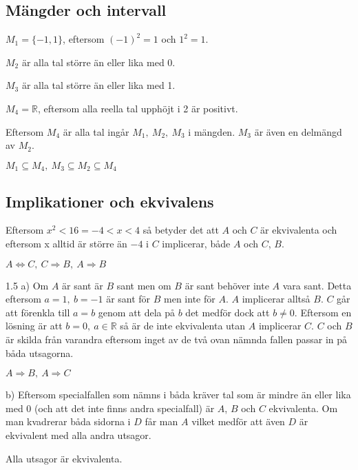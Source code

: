 \subsection*{Mängder och intervall}

\begin{task}{1.3}
	$M_1=\{-1,1\}$, eftersom $(-1)^2=1$ och $1^2=1$.
	
	$M_2$ är alla tal större än eller lika med 0.
	
	$M_3$ är alla tal större än eller lika med 1.
	
	$M_4=\mathbb{R}$, eftersom alla reella tal upphöjt i 2 är positivt.
	
	Eftersom $M_4$ är alla tal ingår $M_1,~M_2,~M_3$ i mängden. $M_3$ är även en delmängd av $M_2$.
	
	\ans $M_1 \subseteq M_4,~ M_3 \subseteq M_2 \subseteq M_4$
\end{task}

\subsection*{Implikationer och ekvivalens}

\begin{task}{1.4}
	Eftersom $x^2<16 = -4<x<4$ så betyder det att $A$ och $C$ är ekvivalenta och
	eftersom x alltid är större än $-4$ i $C$ implicerar, både $A$ och $C$, $B$.
	
	\ans $A \Leftrightarrow C,~ C \Rightarrow B,~ A \Rightarrow B$
\end{task}

\begin{task}{1.5 a)}
	Om $A$ är sant är $B$ sant men om $B$ är sant behöver inte $A$ vara sant. Detta eftersom $a=1,~b=-1$ är sant för $B$ men inte för $A$. $A$ implicerar alltså $B$. $C$ går att förenkla till $a=b$ genom att dela på $b$ det medför dock att $b\neq0$. Eftersom en lösning är att $b=0,~a\in\mathbb{R}$ så är de inte ekvivalenta utan $A$ implicerar $C$. $C$ och $B$ är skilda från varandra eftersom inget av de två ovan nämnda fallen passar in på båda utsagorna. 
	
	\ans $A \Rightarrow B,~ A \Rightarrow C$
\end{task}

\begin{task}{b)}
	Eftersom specialfallen som nämns i  båda kräver tal som är mindre än eller lika med 0 (och att det inte finns andra specialfall) är $A$, $B$ och $C$ ekvivalenta. Om man kvadrerar båda sidorna i $D$ får man $A$ vilket medför att även $D$ är ekvivalent med alla andra utsagor.
	
	\ans Alla utsagor är ekvivalenta.
\end{task}